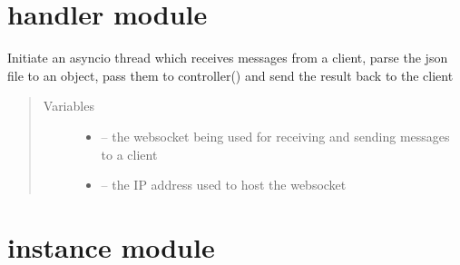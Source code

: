 \documentclass[letterpaper,10pt,english]{sphinxmanual}
\begin{document}
\section{handler module}
\label{\detokenize{handler:handler-module}}\label{\detokenize{handler::doc}}\label{\detokenize{handler:module-handler}}

\begin{fulllineitems}
\label{\detokenize{handler:handler.handler}}
Initiate an asyncio thread which receives messages from a client, parse the json file to an object, pass them to controller() and send the result back to the client
\begin{quote}\begin{description}
\item[{Variables}] \leavevmode\begin{itemize}
\item {} 
 -- the websocket being used for receiving and sending messages to a client

\item {} 
 -- the IP address used to host the websocket

\end{itemize}

\end{description}\end{quote}

\end{fulllineitems}



\section{instance module}
\label{\detokenize{instance:instance-module}}\label{\detokenize{instance:module-instance}}\label{\detokenize{instance::doc}}
\end{document}
